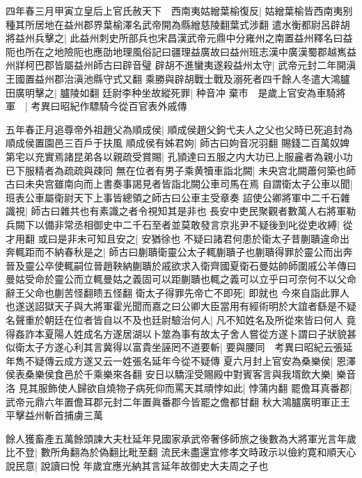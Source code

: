 四年春三月甲寅立皇后上官氏赦天下　西南夷姑繒葉榆復反|{
	姑繒葉榆皆西南夷别種其所居地在益州郡界葉榆澤名武帝開為縣繒慈陵翻葉式涉翻}
遣水衡都尉呂辟胡將益州兵擊之|{
	此益州刺史所部兵也宋昌漢武帝元鼎中分雍州之南置益州釋名曰益阨也所在之地險阨也應劭地理風俗記曰疆理益廣故曰益州班志漢中廣漢蜀郡越嶲益州牂柯巴郡皆屬益州師古曰辟音璧}
辟胡不進蠻夷遂殺益州太守|{
	武帝元封二年開滇王國置益州郡治滇池縣守式又翻}
乘勝與辟胡戰士戰及溺死者四千餘人冬遣大鴻臚田廣明擊之|{
	臚陵如翻}
廷尉李种坐故縱死罪|{
	种音冲}
棄市　是歲上官安為車騎將軍　|{
	考異曰昭紀作驃騎今從百官表外戚傳}


五年春正月追尊帝外祖趙父為順成侯|{
	順成侯趙父鉤弋夫人之父也父時已死追封為順成侯置園邑三百戶于扶風}
順成侯有姊君姁|{
	師古曰姁音况羽翻}
賜錢二百萬奴婢第宅以充實焉諸昆弟各以親疏受賞賜|{
	孔頴達曰五服之内大功已上服麄者為親小功已下服精者為疏疏與疎同}
無在位者有男子乘黄犢車詣北闕|{
	未央宫北闕蕭何築也師古曰未央宫雖南向而上書奏事謁見者皆詣北闕公車司馬在焉}
自謂衛太子公車以聞|{
	班表公車屬衛尉天下上事皆總領之師古曰公車主受章奏}
詔使公卿將軍中二千石雜識視|{
	師古曰雜共也有素識之者令視知其是非也}
長安中吏民聚觀者數萬人右將軍勒兵闕下以備非常丞相御史中二千石至者並莫敢發言京兆尹不疑後到叱從吏收縛|{
	從才用翻}
或曰是非未可知且安之|{
	安猶徐也}
不疑曰諸君何患於衛太子昔蒯聵違命出奔輒距而不納春秋是之|{
	師古曰蒯聵衛靈公太子輒蒯聵子也蒯聵得罪於靈公而出奔晉及靈公卒使輒嗣位晉趙鞅納蒯聵於戚欲求入衛齊國夏衛石曼姑帥師圍戚公羊傳曰曼姑受命於靈公而立輒曼姑之義固可以距蒯聵也輒之義可以立乎曰可奈何不以父命辭王父命也蒯苦怪翻瞆五怪翻}
衛太子得罪先帝亡不即死|{
	即就也}
今來自詣此罪人也遂送詔獄天子與大將軍霍光聞而嘉之曰公卿大臣當用有經術明於大誼者繇是不疑名聲重於朝廷在位者皆自以不及也廷尉驗治何人|{
	凡不知姓名及所從來皆曰何人}
竟得姦詐本夏陽人姓成名方遂居湖以卜筮為事有故太子舍人嘗從方遂卜謂曰子狀貌甚似衛太子方遂心利其言冀得以富貴坐誣罔不道要斬|{
	要與腰同　考異曰昭紀云張延年雋不疑傳云成方遂又云一姓張名延年今從不疑傳}
夏六月封上官安為桑樂侯|{
	恩澤侯表桑樂侯食邑於千乘樂來各翻}
安日以驕淫受賜殿中對賓客言與我壻飲大樂|{
	樂音洛}
見其服飾使人歸欲自燒物子病死仰而罵天其頑悖如此|{
	悖蒲内翻}
罷儋耳真番郡|{
	武帝元鼎六年置儋耳郡元封二年置眞番郡今皆罷之儋都甘翻}
秋大鴻臚廣明軍正王平擊益州斬首捕虜三萬

餘人獲畜產五萬餘頭諫大夫杜延年見國家承武帝奢侈師旅之後數為大將軍光言年歲比不登|{
	數所角翻為於偽翻比毗至翻}
流民未盡還宜修孝文時政示以儉約寛和順天心說民意|{
	說讀曰悅}
年歲宜應光納其言延年故御史大夫周之子也

